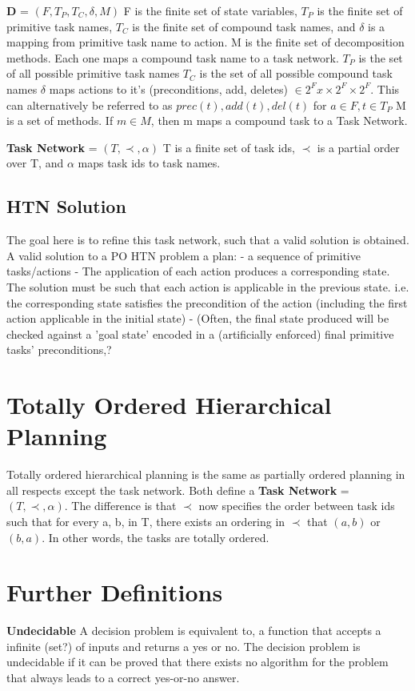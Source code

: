 \textbf{D} = $(F, T_P, T_C, \delta, M)$ \newline
   F is the finite set of state variables, $T_P$ is the finite set of primitive task names, $T_C$ is the finite set of compound task names, and
   $\delta$ is a mapping from primitive task name to action.
   M is the finite set of decomposition methods. Each one maps a compound task name to a task network.
   $T_P$ is the set of all possible primitive task names
   $T_C$ is the set of all possible compound task names
   $\delta$ maps actions to it's (preconditions, add, deletes) $\in 2^F x\times 2^F \times 2^F$. This can alternatively be referred to as $prec(t), add(t), del(t)$ for $a \in F, t \in T_P$
   M is a set of methods. If $m \in M$, then m maps a compound task to a Task Network.

\textbf{Task Network} = $(T, \prec, \alpha)$
 T is a finite set of task ids,
 $\prec$ is a partial order over T, and
 $\alpha$ maps task ids to task names.
 
\subsection{HTN Solution}
The goal here is to refine this task network, such that a valid solution is obtained.
A valid solution to a PO HTN problem a plan:
   - a sequence of primitive tasks/actions
   - The application of each action produces a corresponding state. The solution must be such that each action is applicable
    in the previous state. i.e. the corresponding state satisfies the precondition of the action (including the first action applicable in the initial state)
   - (Often, the final state produced will be checked against a 'goal state' encoded in a (artificially enforced) final primitive tasks' preconditions,? 
     
     
\section{Totally Ordered Hierarchical Planning}
Totally ordered hierarchical planning is the same as partially ordered planning in all respects except the task network.
Both define a \textbf{Task Network} = $(T, \prec, \alpha)$.
The difference is that $\prec$ now specifies the order between task ids such that for every a, b, in T, there exists an ordering
in $\prec$ that $(a, b)$ or $(b, a)$.
In other words, the tasks are totally ordered. 


\section{Further Definitions}
\textbf{Undecidable } A decision problem is equivalent to, a function that accepts a infinite (set?) of inputs and returns a yes or no. The decision problem is undecidable if it can be proved that there exists no algorithm for the problem that always leads to a correct yes-or-no answer.

